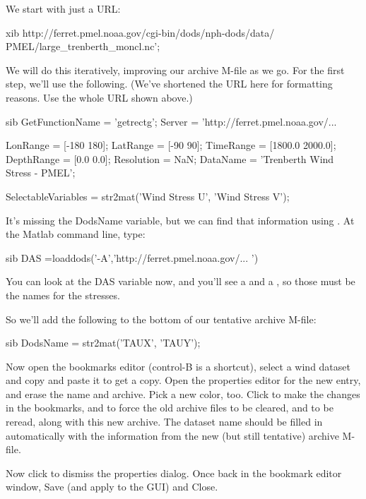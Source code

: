 We start with just a URL:

\begin{vcode}{xib}
http://ferret.pmel.noaa.gov/cgi-bin/dods/nph-dods/data/
  PMEL/large_trenberth_moncl.nc';
\end{vcode}

We will do this iteratively, improving our archive M-file as we go.
For the first step, we'll use the following.  (We've shortened the URL
here for formatting reasons.  Use the whole URL shown above.)

\begin{vcode}{sib}
GetFunctionName = 'getrectg';
Server = 'http://ferret.pmel.noaa.gov/...
          
LonRange = [-180 180];
LatRange = [-90 90];
TimeRange = [1800.0 2000.0];
DepthRange = [0.0 0.0];
Resolution = NaN;
DataName = 'Trenberth Wind Stress - PMEL';

SelectableVariables = str2mat('Wind Stress U', 'Wind Stress V');
\end{vcode}

It's missing the DodsName variable, but we can find that information
using .  At the Matlab command line, type:

\begin{vcode}{sib}
DAS =loaddods('-A','http://ferret.pmel.noaa.gov/... ')
\end{vcode}

You can look at the DAS variable now, and you'll see a  and
a , so those must be the names for the stresses.

So we'll add the following to the bottom of our tentative archive
M-file:

\begin{vcode}{sib}
DodsName = str2mat('TAUX', 'TAUY');
\end{vcode}

Now open the bookmarks editor (control-B is a shortcut), select a wind
dataset and copy and paste it to get a copy.  Open the properties
editor for the new entry, and erase the name and archive.  Pick a new
color, too.  Click  to make the changes in the bookmarks,
and  to force the old archive files to be cleared, and to
be reread, along with this new archive.  The dataset name should be
filled in automatically with the information from the new (but still
tentative) archive M-file.

Now click  to dismiss the properties dialog.  Once back in the
bookmark editor window, Save (and apply to the GUI) and Close.


